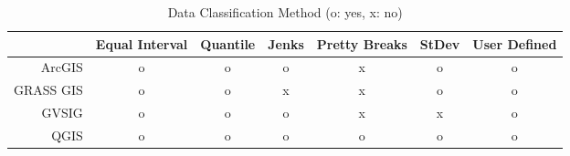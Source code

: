 \begin{table}[h!]
  \centering
  \begin{tabular}{r|c c c c c c}
    \hline
           & Equal Interval & Quantile & Jenks & Pretty Breaks & StDev & User Defined\\
    \hline
    ArcGIS &      o        &    o     &  o    & x &  o  &   o  \\
 GRASS GIS &      o        &    o     &  x    & x &  o  &   o  \\
     GVSIG &      o        &    o     &  o    & x &  x  &   o  \\
      QGIS &      o        &    o     &  o    & o &  o  &   o  \\
    \hline
  \end{tabular}
  \caption{Data Classification Method (o: yes, x: no)}
  \label{tab:classify}
\end{table}

\begin{comment}

``Data Visualization with Spacetime Maps'', Richard L. Brownrigg, 2005
(read further later on)

\grey{To be continued later:
\begin{enumerate}[label*=\arabic*.]
\item ``Geographic Visualization: Designing Manipulable Maps for
    Exploring Temporally Varying Georeferenced Statistics'', MacEachren et al.\
\item ``Strategies for the Visualization of Geographic Time-Series
    Data'', Mark Monmonier, 2011
\item ``Evaluation of Methods for Classifying Epidemiological Data
    on Choropleth Maps in Series'', Brewer and Pickle, 2002
\end{enumerate}}
\end{comment}